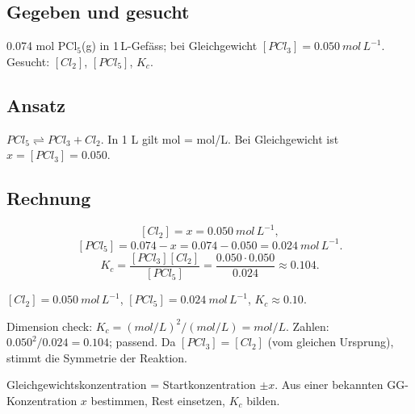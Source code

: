 
\subsection*{Gegeben und gesucht}
0.074 mol PCl$_5$(g) in 1\,L-Gefäss; bei Gleichgewicht
$[PCl_3]=0.050\ mol\,L^{-1}$. Gesucht: $[Cl_2]$, $[PCl_5]$, $K_c$.

\subsection*{Ansatz}
$PCl_5 \rightleftharpoons PCl_3 + Cl_2$. In 1 L gilt mol = mol/L.
Bei Gleichgewicht ist $x = [PCl_3] = 0.050$.

\subsection*{Rechnung}
\[
  [Cl_2] = x = 0.050\ mol\,L^{-1},
\]
\[
  [PCl_5] = 0.074 - x = 0.074-0.050 = 0.024\ mol\,L^{-1}.
\]
\[
  K_c = \frac{[PCl_3][Cl_2]}{[PCl_5]}
      = \frac{0.050\cdot0.050}{0.024}
      \approx 0.104 .
\]

\begin{ergebnis}
$[Cl_2]=0.050\ mol\,L^{-1}$, $[PCl_5]=0.024\ mol\,L^{-1}$,
$K_c \approx 0.10$.
\end{ergebnis}

\begin{kontrolle}
Dimension check: $K_c = (mol/L)^2/(mol/L) = mol/L$. Zahlen: $0.050^2/0.024
= 0.104$; passend. Da $[PCl_3]=[Cl_2]$ (vom gleichen Ursprung), stimmt die
Symmetrie der Reaktion.
\end{kontrolle}

\begin{merksatz}
Gleichgewichtskonzentration = Startkonzentration $\pm x$. Aus einer
bekannten GG-Konzentration $x$ bestimmen, Rest einsetzen, $K_c$ bilden.
\end{merksatz}
